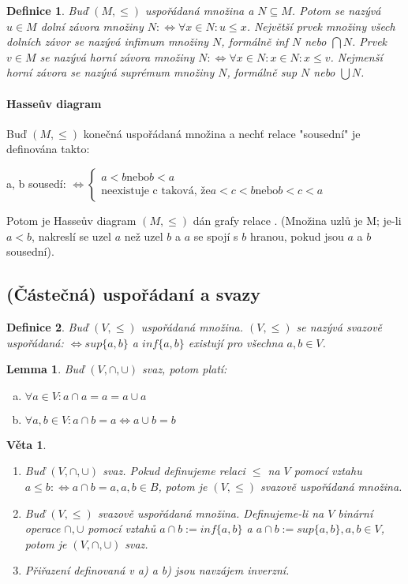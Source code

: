 \documentclass[a4paper, 11pt]{report}
\newtheorem{mydef}{Definice}[chapter]
\newtheorem{veta}{Věta}
\newtheorem{lemma}{Lemma}
\begin{document}
\begin{mydef}
Buď $(M, \leq)$ uspořádaná množina a $N \subseteq M$. Potom se nazývá $u \in M$ dolní závora množiny $N : \Leftrightarrow \forall x \in N: u \leq x$. Největší prvek množiny všech dolních závor se nazývá \emph{infimum} množiny $N$, formálně inf $N$ nebo $\bigcap N$. Prvek $v \in M$ se nazývá horní závora množiny $N: \Leftrightarrow \forall x \in N: x \in N: x \leq v$. Nejmenší horní závora se nazývá suprémum množiny $N$, formálně sup $N$ nebo $\bigcup N$.
\end{mydef}

\paragraph{Hasseův diagram} Buď $(M, \leq)$ konečná uspořádaná množina a nechť relace "sousední" je definována takto:

a, b sousedí: $\Leftrightarrow \begin{cases}
a < b \text{nebo} b < a \\
\text{neexistuje c taková, že} a < c < b \text{nebo} b < c < a
\end{cases}$

Potom je Hasseův diagram $(M, \leq)$ dán grafy relace . (Množina uzlů je M; je-li $a < b$, nakreslí se uzel $a$  než uzel $b$ a $a$ se spojí s $b$ hranou, pokud jsou $a$ a $b$ sousední).

\subsection{(Částečná) uspořádaní a svazy}
\begin{mydef}
Buď $(V, \leq)$ uspořádaná množina. $(V, \leq)$ se nazývá svazově uspořádaná: $\Leftrightarrow sup\{a, b\}$ a $inf\{a, b\}$ existují pro všechna $a, b \in V$.
\end{mydef}

\begin{lemma}
Buď $(V, \cap, \cup)$ svaz, potom platí:
\begin{enumerate}[a)]
	\item $\forall a \in V: a \cap a = a = a \cup a$
	\item $\forall a, b \in V: a \cap b = a \Leftrightarrow a \cup b = b$
\end{enumerate}
\end{lemma}

\begin{veta}
\begin{enumerate}
	\item Buď $(V, \cap, \cup)$ svaz. Pokud definujeme relaci $\leq$ na $V$ pomocí vztahu $a \leq b: \Leftrightarrow a \cap b = a, a,b \in B$, potom je $(V, \leq)$ svazově uspořádaná množina.
	\item Buď $(V, \leq)$ svazově uspořádaná množina. Definujeme-li na $V$ binární operace $\cap, \cup$ pomocí vztahů $a \cap b := inf\{a, b\}$ a $a \cap b := sup\{a, b\}, a, b \in V$, potom je $(V, \cap, \cup)$ svaz.
	\item Přiřazení definovaná v a) a b) jsou navzájem inverzní.
\end{enumerate}
\end{veta}
\end{document}
